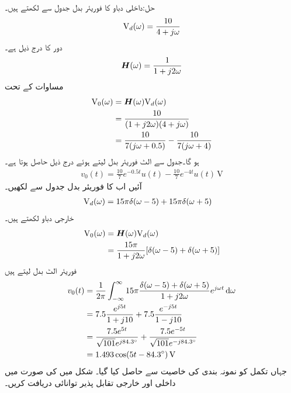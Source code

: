 حل:داخلی دباو  کا فوریئر بدل جدول  سے لکھتے ہیں۔
\begin{align*}
{\ensuremath{{\textup{V}}}}_d(\omega)=\frac{10}{4+j\omega}
\end{align*}
دور کا  درج ذیل ہے۔
\begin{align*}
{\ensuremath{{\boldsymbol{H}}}}(\omega)=\frac{1}{1+j2\omega}
\end{align*}
مساوات  کے تحت
\begin{align*}
{\ensuremath{{\textup{V}}}}_0(\omega)&={{\boldsymbol{H}}}(\omega) {{\textup{V}}}_d(\omega)\\
&=\frac{10}{(1+j2\omega)(4+j\omega)}\\
&=\frac{10}{7(j\omega+0.5)}-\frac{10}{7(j\omega+4)}
\end{align*}
ہو گا۔جدول  سے الٹ فوریئر بدل لیتے ہوئے درج ذیل حاصل ہوتا ہے۔
\begin{align*}
v_0(t)=\frac{10}{7} e^{-0.5t}u(t)-\frac{10}{7}e^{-4t}u(t) \,\si{\volt}
\end{align*}
آئیں اب  کا فوریئر بدل جدول سے لکھیں۔
\begin{align*}
{\ensuremath{{\textup{V}}}}_d(\omega)&=15\pi\delta(\omega-5)+15\pi\delta(\omega+5)
\end{align*}
خارجی دباو لکھتے ہیں۔
\begin{align*}
{\ensuremath{{\textup{V}}}}_0(\omega)&={{\boldsymbol{H}}}(\omega){{\textup{V}}}_d(\omega)\\
&=\frac{15\pi}{1+j2\omega}[\delta(\omega-5)+\delta(\omega+5)]
\end{align*}
فوریئر الٹ بدل لیتے ہیں
\begin{align*}
v_0(t)&=\frac{1}{2\pi}\int_{-\infty}^{\infty} 15\pi \frac{\delta(\omega-5)+\delta(\omega+5)}{1+j2\omega} e^{j\omega t} \dif \omega\\
&=7.5 \frac{e^{j5t}}{1+j10}+7.5\frac{e^{-j5t}}{1-j10}\\
&=\frac{7.5e^{5t}}{\sqrt{101}e^{j84.3^{\circ}}}+\frac{7.5e^{-5t}}{\sqrt{101}e^{-j84.3^{\circ}}}\\
&=1.493\cos(5t-84.3^{\circ})\,\si{\volt}
\end{align*}
جہاں تکمل کو نمونہ بندی کی خاصیت سے حاصل کیا گیا۔
شکل  میں   کی صورت میں داخلی اور خارجی تقابل پذیر توانائی دریافت کریں۔

